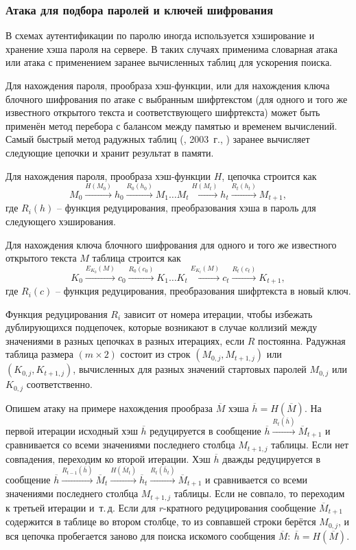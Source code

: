 \subsubsection{Атака для подбора паролей и ключей шифрования}

В схемах аутентификации по паролю иногда используется хэширование и хранение хэша пароля на сервере. В таких случаях применима словарная атака или атака с применением заранее вычисленных таблиц для ускорения поиска.

Для нахождения пароля, прообраза хэш-функции, или для нахождения ключа блочного шифрования по атаке с выбранным шифртекстом (для одного и того же известного открытого текста и соответствующего шифртекста) может быть применён метод перебора с балансом между памятью и временем вычислений. Самый быстрый метод радужных таблиц (, 2003~г., \cite{Oechslin:2003}) заранее вычисляет следующие цепочки и хранит результат в памяти.

Для нахождения пароля, прообраза хэш-функции $H$, цепочка строится как
    \[ M_0 \xrightarrow{H(M_0)} h_0 \xrightarrow{R_0(h_0)} M_1 \ldots M_t \xrightarrow{H(M_t)} h_t \xrightarrow{R_t(h_t)} M_{t+1}, \]
где $R_i(h)$ -- функция редуцирования, преобразования хэша в пароль для следующего хэширования.

Для нахождения ключа блочного шифрования для одного и того же известного открытого текста $M$ таблица строится как
    \[ K_0 \xrightarrow{E_{K_0}(M)} c_0 \xrightarrow{R_0(c_0)} K_1 \ldots K_t \xrightarrow{E_{K_t}(M)} c_t \xrightarrow{R_t(c_t)} K_{t+1}, \]
где $R_i(c)$ -- функция редуцирования, преобразования шифртекста в новый ключ.

Функция редуцирования $R_i$ зависит от номера итерации, чтобы избежать дублирующихся подцепочек, которые возникают в случае коллизий между значениями в разных цепочках в разных итерациях, если $R$ постоянна. Радужная таблица размера $(m \times 2)$ состоит из строк $(M_{0,j}, M_{t+1,j})$ или $(K_{0,j}, K_{t+1,j})$, вычисленных для разных значений стартовых паролей $M_{0,j}$ или $K_{0,j}$ соответственно.

Опишем атаку на примере нахождения прообраза $\overline{M}$ хэша $\overline{h} = H(\overline{M})$. На первой итерации исходный хэш $\overline{h}$ редуцируется в сообщение $\overline{h} \xrightarrow{R_t(\overline{h})} \overline{M}_{t+1} $ и сравнивается со всеми значениями последнего столбца $M_{t+1,j}$ таблицы. Если нет совпадения, переходим ко второй итерации. Хэш $\overline{h}$ дважды редуцируется в сообщение $\overline{h} \xrightarrow{R_{t-1}(\overline{h})} \overline{M}_t \xrightarrow{H(\overline{M}_t)} \overline{h}_t \xrightarrow{R_t(\overline{h}_t)} \overline{M}_{t+1}$ и сравнивается со всеми значениями последнего столбца $M_{t+1,j}$ таблицы. Если не совпало, то переходим к третьей итерации и~т.\,д. Если для $r$-кратного редуцирования сообщение $\overline{M}_{t+1}$ содержится в таблице во втором столбце, то из совпавшей строки берётся $M_{0,j}$, и вся цепочка пробегается заново для поиска искомого сообщения $\overline{M}: ~ \overline{h} = H(\overline{M})$.

